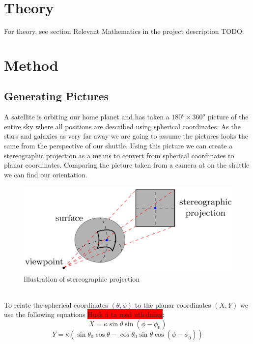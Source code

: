 \documentclass[reprint,english,notitlepage]{revtex4-2}
\begin{document}
\section{Theory} \label{sec:theory}
For theory, see section Relevant Mathematics in the project description%
TODO: %

\section{Method} \label{sec:method}
\subsection{Generating Pictures} \label{subsec: generating pictures}


A satellite is orbiting our home planet and has taken a $ 180 ^{o} \times 360 ^{o} $ picture of the entire sky where all positions are described using spherical coordinates. As the stars and galaxies as very far away we are going to assume the pictures looks the same from the perspective of our shuttle. Using this picture we can create a stereographic projection as a means to convert from spherical coordinates to planar coordinates. Comparing the picture taken from a camera at on the shuttle we can find our orientation.
\begin{figure}[h!]
  \centering
  \includegraphics[scale = .2]{Figures/Stereographic_projection}
  \caption{Illustration of stereographic projection}
  \label{fig: Stereographic Projection}
\end{figure}\\

To relate the spherical coordinates $ (\theta, \phi) $ to the planar coordinates $ (X, Y) $ we use the following equations \colorbox{red}{Husk å ta med utledning}:
\begin{equation} \label{Spherical to X}
	X = κ  \sin θ \sin (ϕ - ϕ _0)
\end{equation}
\begin{equation}\label{Spherical to Y}
	Y = κ (\sin θ _0 \cos  θ - \cos θ _0 \sin θ \cos (ϕ - ϕ _0))  
\end{equation}
\end{document}
